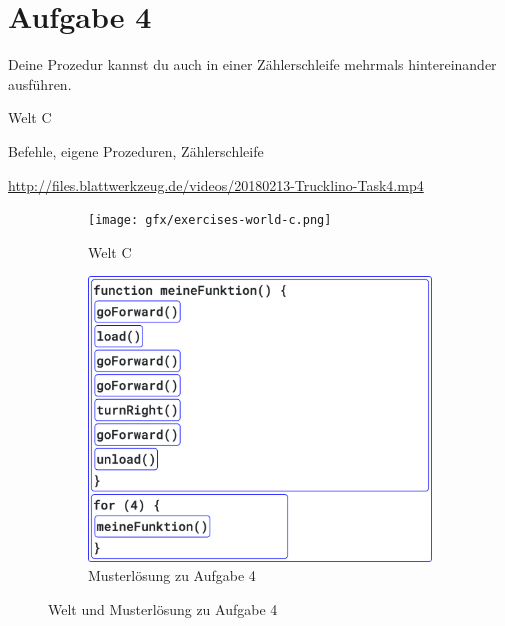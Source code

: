 \pagebreak

\section*{Aufgabe 4}
\label{sec:exercises:4}

Deine Prozedur kannst du auch in einer Zählerschleife mehrmals hintereinander ausführen.

\begin{description}[noitemsep]
  \item[Welt wählen:] Welt C
  \item[Du brauchst:] Befehle, eigene Prozeduren, Zählerschleife
  \item[Video:] \url{http://files.blattwerkzeug.de/videos/20180213-Trucklino-Task4.mp4}
\end{description}

\begin{figure}[H]
  \begin{subfigure}[b]{0.40\textwidth}
    \texttt{[image: gfx/exercises-world-c.png]}
    \caption{Welt C}
  \end{subfigure}\hfill
  \begin{subfigure}[b]{0.40\textwidth}
    \includegraphics[width=\textwidth]{gfx/exercises-program-4.png}
    \caption{Musterlösung zu Aufgabe 4}
  \end{subfigure}\hfill
  \caption{Welt und Musterlösung zu Aufgabe 4}
\end{figure}

\pagebreak

